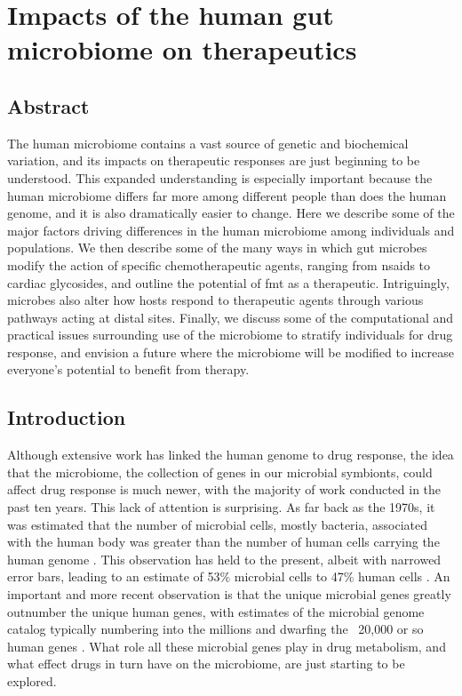 \glsresetall

\chapter{Impacts of the human gut microbiome on therapeutics}

\section{Abstract}

The human microbiome contains a vast source of genetic and biochemical variation, and its impacts on therapeutic responses are just beginning to be understood. This expanded understanding is especially important because the human microbiome differs far more among different people than does the human genome, and it is also dramatically easier to change. Here we describe some of the major factors driving differences in the human microbiome among individuals and populations. We then describe some of the many ways in which gut microbes modify the action of specific chemotherapeutic agents, ranging from \glspl{nsaid} to cardiac glycosides, and outline the potential of \gls{fmt} as a therapeutic. Intriguingly, microbes also alter how hosts respond to therapeutic agents through various pathways acting at distal sites. Finally, we discuss some of the computational and practical issues surrounding use of the microbiome to stratify individuals for drug response, and envision a future where the microbiome will be modified to increase everyone’s potential to benefit from therapy.

\section{Introduction}

Although extensive work has linked the human genome to drug response, the idea that the microbiome, the collection of genes in our microbial symbionts, could affect drug response is much newer, with the majority of work conducted in the past ten years. This lack of attention is surprising. As far back as the 1970s, it was estimated that the number of microbial cells, mostly bacteria, associated with the human body was greater than the number of human cells carrying the human genome \cite{RN4045}. This observation has held to the present, albeit with narrowed error bars, leading to an estimate of 53\% microbial cells to 47\% human cells \cite{RN4039}. An important and more recent observation is that the unique microbial genes greatly outnumber the unique human genes, with estimates of the microbial genome catalog typically numbering into the millions \cite{RN4107,RN4041,RN4040} and dwarfing the ~20,000 or so human genes \cite{RN4043}. What role all these microbial genes play in drug metabolism, and what effect drugs in turn have on the microbiome, are just starting to be explored.

